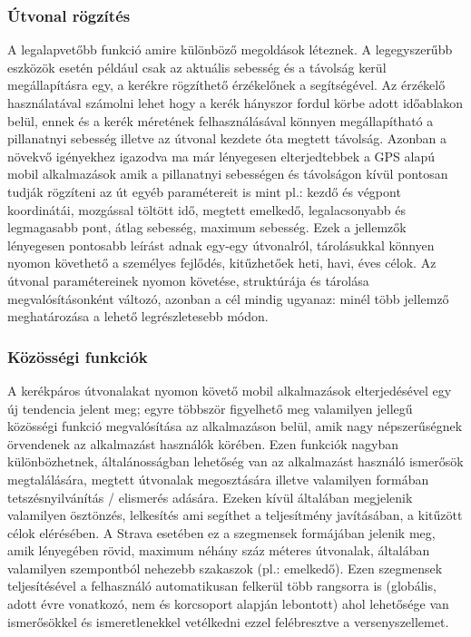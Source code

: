 \subsubsection{Útvonal rögzítés} 
A legalapvetőbb funkció amire különböző megoldások léteznek. A legegyszerűbb eszközök esetén például csak az aktuális sebesség és a távolság kerül megállapításra egy, a kerékre rögzíthető érzékelőnek a segítségével. Az érzékelő használatával számolni lehet hogy a kerék hányszor fordul körbe adott időablakon belül, ennek és a kerék méretének felhasználásával könnyen megállapítható a pillanatnyi sebesség illetve az útvonal kezdete óta megtett távolság. Azonban a növekvő igényekhez igazodva ma már lényegesen elterjedtebbek a GPS alapú mobil alkalmazások amik a pillanatnyi sebességen és távolságon kívül pontosan tudják rögzíteni az út egyéb paramétereit is mint pl.: kezdő és végpont koordinátái, mozgással töltött idő, megtett emelkedő, legalacsonyabb és legmagasabb pont, átlag sebesség, maximum sebesség. Ezek a jellemzők lényegesen pontosabb leírást adnak egy-egy útvonalról, tárolásukkal könnyen nyomon követhető a személyes fejlődés, kitűzhetőek heti, havi, éves célok. Az útvonal paramétereinek nyomon követése, struktúrája és tárolása megvalósításonként változó, azonban a cél mindig ugyanaz: minél több jellemző meghatározása a lehető legrészletesebb módon.

\subsubsection{Közösségi funkciók} 
A kerékpáros útvonalakat nyomon követő mobil alkalmazások elterjedésével egy új tendencia jelent meg; egyre többször figyelhető meg valamilyen jellegű közösségi funkció megvalósítása az alkalmazáson belül, amik nagy népszerűségnek örvendenek az alkalmazást használók körében. Ezen funkciók nagyban különbözhetnek, általánosságban lehetőség van az alkalmazást használó ismerősök megtalálására, megtett útvonalak megosztására illetve valamilyen formában tetszésnyilvánítás / elismerés adására. Ezeken kívül általában megjelenik valamilyen ösztönzés, lelkesítés ami segíthet a teljesítmény javításában, a kitűzött célok elérésében. A Strava esetében ez a szegmensek formájában jelenik meg, amik lényegében rövid, maximum néhány száz méteres útvonalak, általában valamilyen szempontból nehezebb szakaszok (pl.: emelkedő). Ezen szegmensek teljesítésével a felhasználó automatikusan felkerül több rangsorra is (globális, adott évre vonatkozó, nem és korcsoport alapján lebontott) ahol lehetősége van ismerősökkel és ismeretlenekkel vetélkedni ezzel felébresztve a versenyszellemet. 

